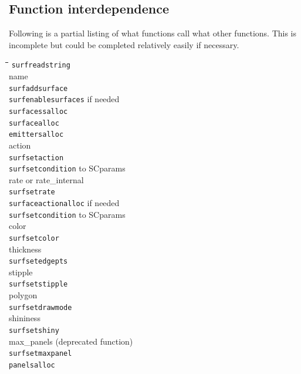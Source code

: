 \documentclass {scrbook}
\newcommand {\ttt} {\texttt}
\begin{document}
\subsection{Function interdependence}

Following is a partial listing of what functions call what other functions. This is incomplete but could be completed relatively easily if necessary.

\begin{tabbing}
\hspace{0.25in}\=\hspace{0.25in}\=\hspace{0.25in}\=\hspace{0.25in}\=\hspace{0.25in}\=\hspace{0.25in}\=\kill
\ttt{surfreadstring}\\
\>name\\
\>\>\ttt{surfaddsurface}\\
\>\>\>\ttt{surfenablesurfaces} if needed\\
\>\>\>\>\ttt{surfacessalloc}\\
\>\>\>\>\>\ttt{surfacealloc}\\
\>\>\>\>\>\>\ttt{emittersalloc}\\
\>action\\
\>\>\ttt{surfsetaction}\\
\>\>\>\ttt{surfsetcondition} to SCparams\\
\>rate or rate\_internal\\
\>\>\ttt{surfsetrate}\\
\>\>\>\ttt{surfaceactionalloc} if needed\\
\>\>\>\ttt{surfsetcondition} to SCparams\\
\>color\\
\>\>\ttt{surfsetcolor}\\
\>thickness\\
\>\>\ttt{surfsetedgepts}\\
\>stipple\\
\>\>\ttt{surfsetstipple}\\
\>polygon\\
\>\>\ttt{surfsetdrawmode}\\
\>shininess\\
\>\>\ttt{surfsetshiny}\\
\>max\_panels (deprecated function)\\
\>\>\ttt{surfsetmaxpanel}\\
\>\>\>\ttt{panelsalloc}\\

\end{tabbing}
\end{document}

